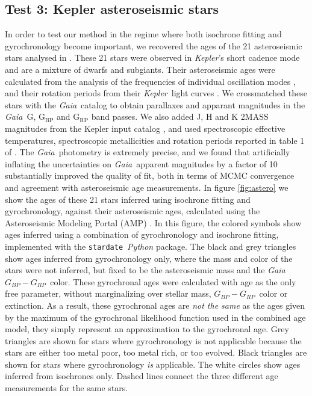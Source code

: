 \documentclass[useAMS, usenatbib, preprint, 12pt]{aastex}
\newcommand{\kepler}{{\it Kepler}}
\newcommand{\Gaia}{{\it Gaia}}
\newcommand{\gaia}{{\it Gaia}}
\newcommand{\sd}{{\tt stardate}}
\newcommand{\gcolor}{$G_{BP} - G_{RP}$}
\newcommand{\racomment}[1]{{\bf #1}}
\begin{document}
\subsection{Test 3: Kepler asteroseismic stars}
    In order to test our method in the regime where both isochrone
fitting and gyrochronology become important, we recovered the ages of the 21
asteroseismic stars analysed in \citet{vansaders2016}.
These 21 stars were observed in \kepler's short cadence mode and are a mixture
of dwarfs and subgiants.
Their asteroseismic ages were calculated from the analysis of the frequencies
of individual oscillation modes \citep{mathur2012, metcalfe2014,
silvaaguirre2015, ceillier2016}, and their rotation periods from their
\kepler\ light curves \citep{garcia2014}.
We crossmatched these stars with the \Gaia\ catalog to obtain parallaxes and
apparant magnitudes in the \Gaia\ G, $\mathrm{G_{BP}}$ and $\mathrm{G_{RP}}$
band passes.
We also added J, H and K 2MASS magnitudes from the Kepler input catalog
\citep{brown2011},
and used spectroscopic effective temperatures, spectroscopic metallicities and
rotation periods reported in table 1 of \citet{vansaders2016}.
The \gaia\ photometry is extremely precise, and we found that artificially
inflating the uncertainties on \gaia\ apparent magnitudes by a factor of 10
substantially improved the quality of fit, both in terms of MCMC convergence
and agreement with asteroseismic age measurements.
In figure \ref{fig:astero} we show the ages of these 21 stars inferred using
isochrone fitting and gyrochronology, against their asteroseismic ages,
calculated using the Asteroseismic Modeling Portal (AMP) \citep{metcalfe2009,
metcalfe2012, metcalfe2014}.
In this figure, the colored symbols show ages inferred using a combination of
gyrochronology and isochrone fitting, implemented with the \sd\ {\it Python}
package.
The black and grey triangles show ages inferred from gyrochronology only,
where the mass and color of the stars were not inferred, but fixed to be the
asteroseismic mass and the \gaia\ \gcolor\ color.
These gyrochronal ages were calculated with age as the only free parameter,
without marginalizing over stellar mass, \gcolor\ color or extinction.
As a result, these gyrochronal ages are {\it not the same} as the ages given
by the maximum of the gyrochronal likelihood function used in the combined
age model, they simply represent an approximation to the gyrochronal age.
Grey triangles are shown for stars where gyrochronology is not applicable
because the stars are either too metal poor, too metal rich, or too evolved.
Black triangles are shown for stars where gyrochronology {\it is} applicable.
The white circles show ages inferred from isochrones only.
Dashed lines connect the three different age measurements for the same
stars.
\end{document}

